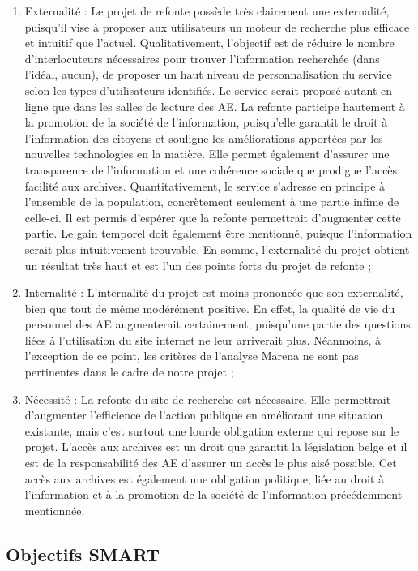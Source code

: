 \documentclass[a4paper,12pt]{article}
\begin{document}
\begin{enumerate}
\begin{itemize}
	\end{itemize}
	\item Externalité : Le projet de refonte possède très clairement une externalité, puisqu'il vise à proposer aux utilisateurs un moteur de recherche plus efficace et intuitif que l'actuel. Qualitativement, l'objectif est de réduire le nombre d'interlocuteurs nécessaires pour trouver l'information recherchée (dans l'idéal, aucun), de proposer un haut niveau de personnalisation du service selon les types d'utilisateurs identifiés. Le service serait proposé autant en ligne que dans les salles de lecture des AE. La refonte participe hautement à la promotion de la société de l'information, puisqu'elle garantit le droit à l'information des citoyens et souligne les améliorations apportées par les nouvelles technologies en la matière. Elle permet également d'assurer une transparence de l'information et une cohérence sociale que prodigue l'accès facilité aux archives. Quantitativement, le service s'adresse en principe à l'ensemble de la population, concrètement seulement à une partie infime de celle-ci. Il est permis d'espérer que la refonte permettrait d'augmenter cette partie. Le gain temporel doit également être mentionné, puisque l'information serait plus intuitivement trouvable. En somme, l'externalité du projet obtient un résultat très haut et est l'un des points forts du projet de refonte ;
	\item Internalité : L'internalité du projet est moins prononcée que son externalité, bien que tout de même modérément positive. En effet, la qualité de vie du personnel des AE augmenterait certainement, puisqu'une partie des questions liées à l'utilisation du site internet ne leur arriverait plus. Néanmoins, à l'exception de ce point, les critères de l'analyse Marena ne sont pas pertinentes dans le cadre de notre projet ;
	\item Nécessité : La refonte du site de recherche est nécessaire. Elle permettrait d'augmenter l'efficience de l'action publique en améliorant une situation existante, mais c'est surtout une lourde obligation externe qui repose sur le projet. L'accès aux archives est un droit que garantit la législation belge et il est de la responsabilité des AE d'assurer un accès le plus aisé possible. Cet accès aux archives est également une obligation politique, liée au droit à l'information et à la promotion de la société de l'information précédemment mentionnée.
\end{enumerate}

\subsection{Objectifs SMART}
\end{document}
